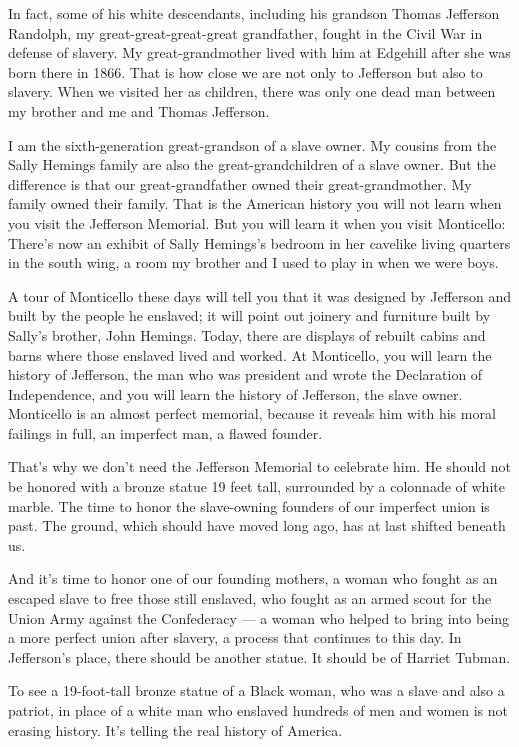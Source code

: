 In fact, some of his white descendants, including his grandson Thomas
Jefferson Randolph, my great-great-great-great grandfather, fought in
the Civil War in defense of slavery. My great-grandmother lived with him
at Edgehill after she was born there in 1866. That is how close we are
not only to Jefferson but also to slavery. When we visited her as
children, there was only one dead man between my brother and me and
Thomas Jefferson.

I am the sixth-generation great-grandson of a slave owner. My cousins
from the Sally Hemings family are also the great-grandchildren of a
slave owner. But the difference is that our great-grandfather owned
their great-grandmother. My family owned their family. That is the
American history you will not learn when you visit the Jefferson
Memorial. But you will learn it when you visit Monticello: There's now
an exhibit of Sally Hemings's bedroom in her cavelike living quarters in
the south wing, a room my brother and I used to play in when we were
boys.

A tour of Monticello these days will tell you that it was designed by
Jefferson and built by the people he enslaved; it will point out joinery
and furniture built by Sally's brother, John Hemings. Today, there are
displays of rebuilt cabins and barns where those enslaved lived and
worked. At Monticello, you will learn the history of Jefferson, the man
who was president and wrote the Declaration of Independence, and you
will learn the history of Jefferson, the slave owner. Monticello is an
almost perfect memorial, because it reveals him with his moral failings
in full, an imperfect man, a flawed founder.

That's why we don't need the Jefferson Memorial to celebrate him. He
should not be honored with a bronze statue 19 feet tall, surrounded by a
colonnade of white marble. The time to honor the slave-owning founders
of our imperfect union is past. The ground, which should have moved long
ago, has at last shifted beneath us.

And it's time to honor one of our founding mothers, a woman who fought
as an escaped slave to free those still enslaved, who fought as an armed
scout for the Union Army against the Confederacy --- a woman who helped
to bring into being a more perfect union after slavery, a process that
continues to this day. In Jefferson's place, there should be another
statue. It should be of Harriet Tubman.

To see a 19-foot-tall bronze statue of a Black woman, who was a slave
and also a patriot, in place of a white man who enslaved hundreds of men
and women is not erasing history. It's telling the real history of
America.

